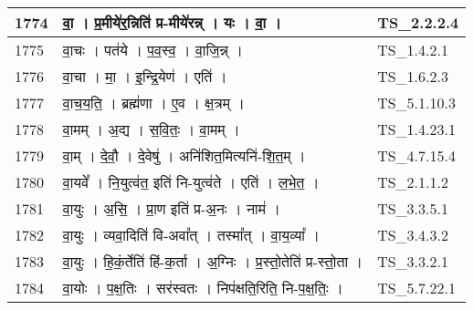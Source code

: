 \documentclass[17pt]{extarticle}
\begin{document}
\begin{longtable}{||p{0.4in}||p{4.9in}||p{0.9in}||}
    1774 & वा॒   ।   प्र॒मीये॑र॒न्निति॑ प्र{-}मीये॑रन्न्   ।   यः   ।   वा॒   ।    & TS\_2.2.2.4       \\
    
    \hline
        
    1775 & वा॒चः   ।   पत॑ये   ।   प॒व॒स्व॒   ।   वा॒जि॒न्न्   ।    & TS\_1.4.2.1       \\
    
    \hline
        
    1776 & वा॒चा   ।   मा॒   ।   इ॒न्द्रि॒येण॑   ।   एति॑   ।    & TS\_1.6.2.3       \\
    
    \hline
        
    1777 & वा॒च॒य॒ति॒   ।   ब्रह्म॑णा   ।   ए॒व   ।   क्ष॒त्रम्   ।    & TS\_5.1.10.3       \\
    
    \hline
        
    1778 & वा॒मम्   ।   अ॒द्य   ।   स॒वि॒तः॒   ।   वा॒मम्   ।    & TS\_1.4.23.1       \\
    
    \hline
        
    1779 & वा॒म्   ।   दे॒वौ॒   ।   दे॒वेषु॑   ।   अनि॑शित॒मित्यनि॑{-}शि॒त॒म्   ।    & TS\_4.7.15.4       \\
    
    \hline
        
    1780 & वा॒यवे᳚   ।   नि॒युत्व॑त॒ इति॑ नि{-}युत्व॑ते   ।   एति॑   ।   ल॒भे॒त॒   ।    & TS\_2.1.1.2       \\
    
    \hline
        
    1781 & वा॒युः   ।   अ॒सि॒   ।   प्रा॒ण इति॑ प्र{-}अ॒नः   ।   नाम॑   ।    & TS\_3.3.5.1       \\
    
    \hline
        
    1782 & वा॒युः   ।   व्यवा॒दिति॑ वि{-}अवा᳚त्   ।   तस्मा᳚त्   ।   वा॒य॒व्या᳚   ।    & TS\_3.4.3.2       \\
    
    \hline
        
    1783 & वा॒युः   ।   हि॒कं॒र्तेति॑ हिं{-}क॒र्ता   ।   अ॒ग्निः   ।   प्र॒स्तो॒तेति॑ प्र{-}स्तो॒ता   ।    & TS\_3.3.2.1       \\
    
    \hline
        
    1784 & वा॒योः   ।   प॒क्ष॒तिः   ।   सर॑स्वतः   ।   निप॑क्षति॒रिति॒ नि{-}प॒क्ष॒तिः॒   ।    & TS\_5.7.22.1       \\
    

\end{longtable}
\end{document}
